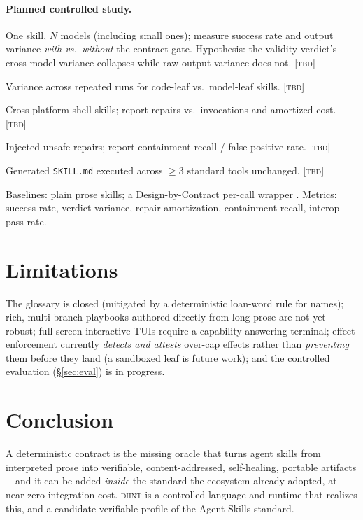 \documentclass[11pt]{article}
\newcommand{\dhnt}{\textsc{dhnt}}
\begin{document}
\paragraph{Planned controlled study.}
\begin{description}[topsep=2pt,itemsep=1pt,leftmargin=2.4em]
\item[E1 Cross-model convergence.] One skill, $N$ models (including small ones);
measure success rate and output variance \emph{with vs.\ without} the contract
gate. Hypothesis: the validity verdict's cross-model variance collapses while raw
output variance does not. \textsc{[tbd]}
\item[E2 Determinism/repeatability.] Variance across repeated runs for code-leaf
vs.\ model-leaf skills. \textsc{[tbd]}
\item[E3 Self-healing on a real task suite.] Cross-platform shell skills;
report repairs vs.\ invocations and amortized cost. \textsc{[tbd]}
\item[E4 Effect containment.] Injected unsafe repairs; report containment recall
/ false-positive rate. \textsc{[tbd]}
\item[E5 Interop breadth.] Generated \texttt{SKILL.md} executed across $\geq 3$
standard tools unchanged. \textsc{[tbd]}
\end{description}
Baselines: plain prose skills; a Design-by-Contract per-call wrapper
\cite{dbcagent}. Metrics: success rate, verdict variance, repair amortization,
containment recall, interop pass rate.

\section{Limitations}\label{sec:limits}

The glossary is closed (mitigated by a deterministic loan-word rule for names);
rich, multi-branch playbooks authored directly from long prose are not yet
robust; full-screen interactive TUIs require a capability-answering terminal;
effect enforcement currently \emph{detects and attests} over-cap effects rather
than \emph{preventing} them before they land (a sandboxed leaf is future work);
and the controlled evaluation (\S\ref{sec:eval}) is in progress.

\section{Conclusion}

A deterministic contract is the missing oracle that turns agent skills from
interpreted prose into verifiable, content-addressed, self-healing, portable
artifacts---and it can be added \emph{inside} the standard the ecosystem already
adopted, at near-zero integration cost. \dhnt{} is a controlled language and
runtime that realizes this, and a candidate verifiable profile of the Agent
Skills standard.
\end{document}
